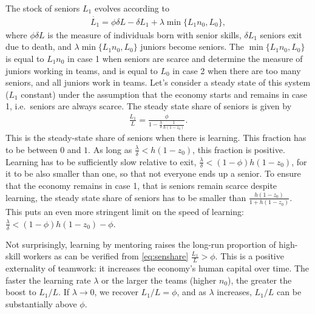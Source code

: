 \documentclass[12pt]{article}
\begin{document}
{%

The stock of seniors \(L_1\) evolves according to 
\begin{align*}
\dot{L_1} = \phi\delta L -\delta L_1 +\lambda \min\{L_1n_0,L_0\},
\end{align*}
where $\phi \delta L$ is the measure of individuals born with senior skills, $\delta L_1$ seniors exit due to death, and $\lambda \min\{L_1n_0,L_0\}$ juniors become seniors. The $\min\{L_1n_0,L_0\}$ is equal to $L_1n_0$ in case 1 when seniors are scarce and determine the measure of juniors working in teams, and is equal to $L_0$ in case 2 when there are too many seniors, and all juniors work in teams. Let's consider a steady state of this system ($L_1$ constant) under the assumption that the economy starts and remains in case 1, i.e.\ seniors are always scarce. The steady state share of seniors is given by
\begin{align}\label{eq:senshare}
\frac{L_1}{L} = \frac{\phi}{1-\frac{\lambda}{\delta} \frac{1}{h(1-z_0)}}.
\end{align}
This is the steady-state share of seniors when there is learning. This fraction has to be between $0$ and $1$. As long as \(\frac{\lambda}{\delta} < h(1-z_0)\), this fraction is positive. Learning has to be sufficiently slow relative to exit, $\frac{\lambda}{\delta} < (1-\phi)h(1-z_0)$, for it to be also smaller than one, so that not everyone ends up a senior. To ensure that the economy remains in case 1, that is seniors remain scarce despite learning, the steady state share of seniors has to be smaller than $\frac{h(1-z_0)}{1+h(1-z_0)}$. This puts an even more stringent limit on the speed of learning:  $\frac{\lambda}{\delta} < (1-\phi)h(1-z_0)-\phi$. 

Not surprisingly, learning by mentoring raises the long-run proportion of high-skill workers as can be verified from \eqref{eq:senshare} $\frac{L_1}{L} > \phi$. This is a positive externality of teamwork: it increases the economy's human capital over time. The faster the learning rate \(\lambda\) or the larger the teams (higher \(n_0\)), the greater the boost to \(L_1/L\). If \(\lambda \to 0\), we recover \(L_1/L = \phi\), and as \(\lambda\) increases, \(L_1/L\) can be substantially above \(\phi\).

}
\end{document}
